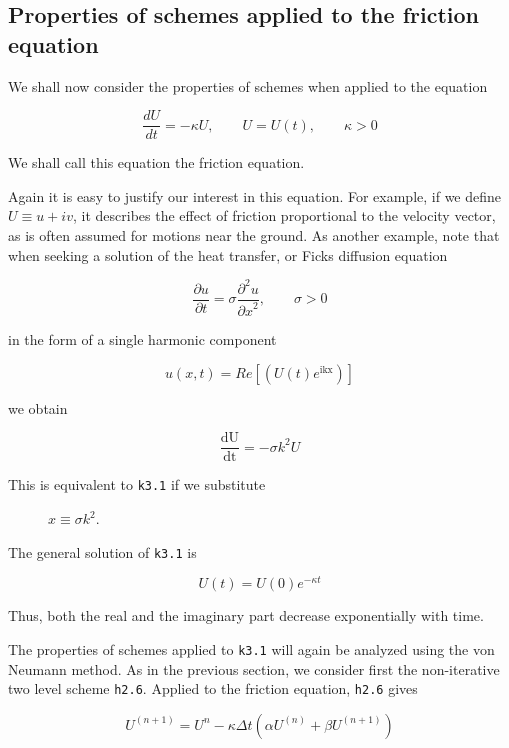 \subsection{\texorpdfstring{\textbf{Properties of schemes applied to the
friction
equation}}{Properties of schemes applied to the friction equation}}\label{properties-of-schemes-applied-to-the-friction-equation}

We shall now consider the properties of schemes when applied to the
equation

{\[\frac{d U}{d t} = - \kappa U, \qquad U = U\left( t \right), \qquad \kappa > 0\]}

We shall call this equation the friction equation.

Again it is easy to justify our interest in this equation. For example,
if we define \(U \equiv u + iv\), it describes the effect of friction
proportional to the velocity vector, as is often assumed for motions
near the ground. As another example, note that when seeking a solution
of the heat transfer, or Fick\textquotesingle s diffusion equation

\[\frac{\partial u}{\partial t} = \sigma\frac{\partial^{2} u }{{\partial x}^{2}}, \qquad \sigma > 0\]

in the form of a single harmonic component

\[u\left( x,t \right) = Re\left\lbrack \left( U\left( t \right)e^{\text{ikx}} \right) \right\rbrack\]

we obtain

\[\frac{\text{dU}}{\text{dt}} = - \sigma k^{2}U\]

\begin{description}
\item[This is equivalent to \texttt{k3.1} if we substitute]
\(x \equiv \sigma k^{2}\).
\end{description}

The general solution of \texttt{k3.1} is

{\[U\left( t \right) = U\left( 0 \right)e^{- \kappa t}\]}

Thus, both the real and the imaginary part decrease exponentially with
time.

The properties of schemes applied to \texttt{k3.1} will again be
analyzed using the von Neumann method. As in the previous section, we
consider first the non-iterative two level scheme \texttt{h2.6}. Applied
to the friction equation, \texttt{h2.6} gives

{\[U^{(n + 1)} = U^{n} - \kappa\Delta t \left( \alpha U^{( n )} + \beta U^{\left( n + 1 \right)} \right)\]}

